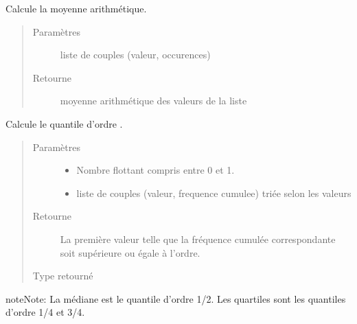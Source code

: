 \documentclass[letterpaper,10pt,french]{sphinxmanual}
\begin{document}
\begin{fulllineitems}
\label{\detokenize{addQuantitativesDiscretes:add.addQuantitativesDiscretes.moyenne}}
Calcule la moyenne arithmétique.
\begin{quote}\begin{description}
\item[{Paramètres}] \leavevmode
{} \textendash{} liste de couples (valeur, occurences)

\item[{Retourne}] \leavevmode
moyenne arithmétique des valeurs de la liste

\end{description}\end{quote}

\end{fulllineitems}


\begin{fulllineitems}
\label{\detokenize{addQuantitativesDiscretes:add.addQuantitativesDiscretes.quantileDiscret}}
Calcule le quantile d’ordre .
\begin{quote}\begin{description}
\item[{Paramètres}] \leavevmode\begin{itemize}
\item {} 
 \textendash{} Nombre flottant compris entre 0 et 1.

\item {} 
 \textendash{} liste de couples (valeur, frequence cumulee) triée selon les valeurs

\end{itemize}

\item[{Retourne}] \leavevmode
La première valeur telle que la fréquence cumulée correspondante soit supérieure ou égale à l’ordre.

\item[{Type retourné}] \leavevmode
{}

\end{description}\end{quote}

\begin{sphinxadmonition}{note}{Note:}
La médiane est le quantile d’ordre 1/2. Les quartiles sont les quantiles d’ordre 1/4 et 3/4.
\end{sphinxadmonition}

\end{fulllineitems}
\end{document}

